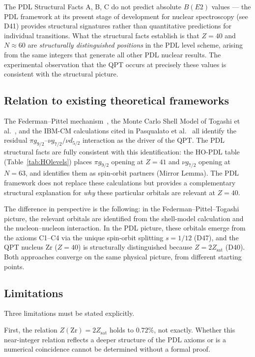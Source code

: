 \documentclass[11pt,a4paper]{article}
\theoremstyle{definition}
\theoremstyle{remark}
\newcommand{\Zsat}{Z_{\mathrm{sat}}}
\begin{document}
The PDL Structural Facts A, B, C do not predict absolute $B(E2)$ values --- the PDL framework at its present stage of development for nuclear spectroscopy (see D41) provides structural signatures rather than quantitative predictions for individual transitions. What the structural facts establish is that $Z=40$ and $N\approx 60$ are \emph{structurally distinguished positions} in the PDL level scheme, arising from the same integers that generate all other PDL nuclear results. The experimental observation that the QPT occurs at precisely these values is consistent with the structural picture.

\subsection{Relation to existing theoretical frameworks}

The Federman--Pittel mechanism~\cite{Federman_1977}, the Monte Carlo Shell Model of Togashi et al.~\cite{Togashi_2016}, and the IBM-CM calculations cited in Pasqualato et al.~\cite{Pasqualato_2024} all identify the residual $\pi g_{9/2}$--$\nu g_{7/2}/\nu d_{5/2}$ interaction as the driver of the QPT. The PDL structural facts are fully consistent with this identification: the HO-PDL table (Table~\ref{tab:HOlevels}) places $\pi g_{9/2}$ opening at $Z=41$ and $\nu g_{7/2}$ opening at $N=63$, and identifies them as spin-orbit partners (Mirror Lemma). The PDL framework does not replace these calculations but provides a complementary structural explanation for \emph{why} these particular orbitals are relevant at $Z=40$.

The difference in perspective is the following: in the Federman--Pittel--Togashi picture, the relevant orbitals are identified from the shell-model calculation and the nucleon--nucleon interaction. In the PDL picture, these orbitals emerge from the axioms C1--C4 via the unique spin-orbit splitting $s = 1/12$ (D47), and the QPT nucleus Zr ($Z=40$) is structurally distinguished because $Z = 2\Zsat$ (D40). Both approaches converge on the same physical picture, from different starting points.

\subsection{Limitations}

Three limitations must be stated explicitly.

First, the relation $Z(\mathrm{Zr}) = 2\Zsat$ holds to $0.72\%$, not exactly. Whether this near-integer relation reflects a deeper structure of the PDL axioms or is a numerical coincidence cannot be determined without a formal proof.
\end{document}
